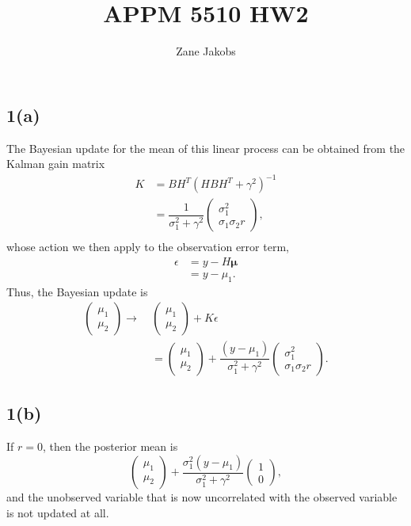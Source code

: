 \documentclass[11pt]{article}
\begin{document}
\title{APPM 5510 HW2}
\author{Zane Jakobs}
\date{}
\maketitle

\subsection*{1(a)} 
The Bayesian update for the mean of this linear process can be obtained from the Kalman gain matrix
\[
\begin{aligned}
K &= BH^T(HBH^T + \gamma^2)^{-1}\\
&= \dfrac{1}{\sigma_1^2 + \gamma^2} \begin{pmatrix}\sigma_1^2 \\ \sigma_1\sigma_2 r\end{pmatrix}, \\
\end{aligned}
\]
whose action we then apply to the observation error term, 
\[
\begin{aligned}
\epsilon &= y - H\mathbf{\mu}\\
&= y - \mu_1.
\end{aligned}
\]
Thus, the Bayesian update is 
\[
\begin{aligned}
\begin{pmatrix}\mu_1 \\ \mu_2 \end{pmatrix} \to \ & \begin{pmatrix}\mu_1 \\ \mu_2 \end{pmatrix} + K\epsilon\\
			&= \begin{pmatrix}\mu_1 \\ \mu_2 \end{pmatrix} + \dfrac{(y-\mu_1)}{\sigma_1^2 + \gamma^2} \begin{pmatrix}\sigma_1^2 \\ \sigma_1\sigma_2 r\end{pmatrix}.
\end{aligned}
\]
\subsection*{1(b)} If $r = 0$, then the posterior mean is
\[
\begin{pmatrix}\mu_1 \\ \mu_2 \end{pmatrix} + \dfrac{\sigma_1^2(y-\mu_1)}{\sigma_1^2 + \gamma^2} \begin{pmatrix}1 \\ 0\end{pmatrix},
\]
and the unobserved variable that is now uncorrelated with the observed variable is not updated at all.
\end{document}
